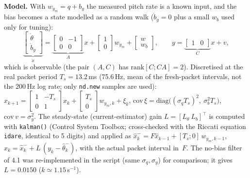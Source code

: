 \textbf{Model.} With $w_{y_m}=q+b_y$ the measured pitch rate is a known input, and the bias becomes a state
modelled as a random walk ($\dot b_y=0$ plus a small $w_b$ used only for tuning):
\begin{equation*}
\underbrace{\begin{bmatrix}\dot\theta\\ \dot b_y\end{bmatrix}}_{\dot x}=
\underbrace{\begin{bmatrix}0&-1\\0&0\end{bmatrix}}_{A}x+\begin{bmatrix}1\\0\end{bmatrix}w_{y_m}+\begin{bmatrix}w\\ w_b\end{bmatrix},\qquad
y=\underbrace{\begin{bmatrix}1&0\end{bmatrix}}_{C}x+v,
\end{equation*}
which is observable (the pair $(A,C)$ has $\mathrm{rank}[C;CA]=2$). Discretised at the real packet period
$T_s=13.2$\,ms (75.6\,Hz, mean of the fresh-packet intervals, not the 200\,Hz log rate; only \texttt{nd.new} samples are used):
$x_{k+1}=\left[\begin{smallmatrix}1&-T_s\\0&1\end{smallmatrix}\right]x_k+\left[\begin{smallmatrix}T_s\\0\end{smallmatrix}\right]w_{y_m,k}+\xi_k$,
$\mathrm{cov}\,\xi=\mathrm{diag}\big((\sigma_qT_s)^2,\ \sigma_b^2T_s\big)$, $\mathrm{cov}\,v=\sigma_y^2$.
The steady-state (current-estimator) gain $L=[L_\theta\ L_b]^\top$ is computed with \texttt{kalman()} (Control System Toolbox;
cross-checked with the Riccati equation \texttt{idare}, identical to 5 digits) and applied as
$\hat x_k^-=F\hat x_{k-1}+[T_s;0]\,w_{y_m,k-1}$, $\hat x_k=\hat x_k^-+L\,(y_k-\hat\theta_k^-)$, with the actual packet interval in~$F$.
The no-bias filter of 4.1 was re-implemented in the script (same $\sigma_q,\sigma_y$) for comparison; it gives $L=0.0150$ ($k\simeq1.15$\,s$^{-1}$).

